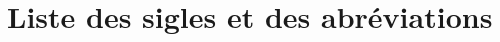 \documentclass[12pt,twoside,maitrise]{dms}
\theoremstyle{definition}
\numberwithin{equation}{section}
\numberwithin{table}{chapter}
\numberwithin{figure}{chapter}
\begin{document}
\anglais

\setcounter{tocdepth}{1} %
\appto{}

\cleardoublepage
{}  %
\tableofcontents
\cleardoublepage
{}  %
\listoftables



\chapter*{Liste des sigles et des abréviations}
\end{document}
